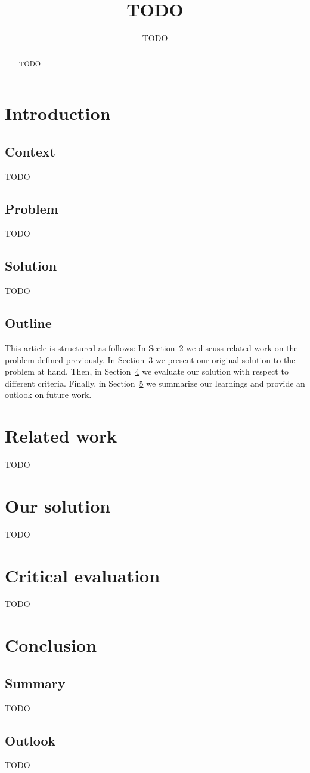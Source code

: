 \documentclass{IEEEtran}
\title{TODO}
\author{TODO}
\begin{document}
    \maketitle

    \begin{abstract}
        TODO
    \end{abstract}
    
    \section{Introduction}
    \label{sec:introduction}

    \subsection*{Context}
    TODO~\cite{Hackenberg2014}~\cite{Legat2014}~\cite{Teufl2015}

    \subsection*{Problem}
    TODO

    \subsection*{Solution}
    TODO

    \subsection*{Outline}
    This article is structured as follows:
    In Section~\ref{sec:differentiation} we discuss related work on the problem defined previously.
    In Section~\ref{sec:contribution} we present our original solution to the problem at hand.
    Then, in Section~\ref{sec:evaluation} we evaluate our solution with respect to different criteria.
    Finally, in Section~\ref{sec:conclusion} we summarize our learnings and provide an outlook on future work.
    
    \section{Related work}
    \label{sec:differentiation}
    TODO
    
    \section{Our solution}
    \label{sec:contribution}
    TODO
    
    \section{Critical evaluation}
    \label{sec:evaluation}
    TODO

    \section{Conclusion}
    \label{sec:conclusion}

    \subsection*{Summary}
    TODO

    \subsection*{Outlook}
    TODO

    
    
\end{document}
